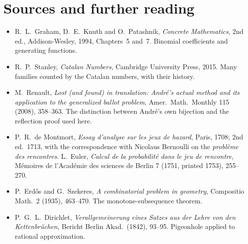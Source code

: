 \section*{Sources and further reading}
\begin{itemize}\raggedright
\item R.~L.~Graham, D.~E.~Knuth and O.~Patashnik, \emph{Concrete Mathematics}, 2nd ed., Addison-Wesley, 1994, Chapters~5 and~7. Binomial coefficients and generating functions.
\item R.~P.~Stanley, \emph{Catalan Numbers}, Cambridge University Press, 2015. Many families counted by the Catalan numbers, with their history.
\item M.~Renault, \emph{Lost (and found) in translation: Andr\'e's actual method and its application to the generalized ballot problem}, Amer.\ Math.\ Monthly 115 (2008), 358--363. The distinction between Andr\'e's own bijection and the reflection proof used here.
\item P.~R.~de Montmort, \emph{Essay d'analyse sur les jeux de hazard}, Paris, 1708; 2nd ed.\ 1713, with the correspondence with Nicolaus Bernoulli on the \emph{probl\`eme des rencontres}. L.~Euler, \emph{Calcul de la probabilit\'e dans le jeu de rencontre}, M\'emoires de l'Acad\'emie des sciences de Berlin 7 (1751, printed 1753), 255--270.
\item P.~Erd\H{o}s and G.~Szekeres, \emph{A combinatorial problem in geometry}, Compositio Math.\ 2 (1935), 463--470. The monotone-subsequence theorem.
\item P.~G.~L.~Dirichlet, \emph{Verallgemeinerung eines Satzes aus der Lehre von den Kettenbr\"uchen}, Bericht Berlin Akad.\ (1842), 93--95. Pigeonhole applied to rational approximation.
\end{itemize}

